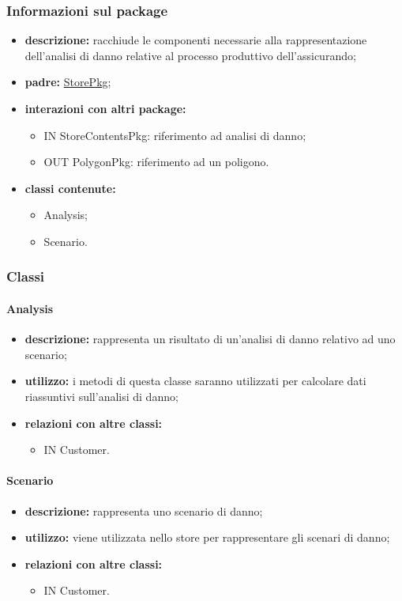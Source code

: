 \subsubsection{Informazioni sul package}
\begin{itemize}
	\item \textbf{descrizione:} racchiude le componenti necessarie alla rappresentazione dell'analisi di danno relative al processo produttivo dell'assicurando;
	\item \textbf{padre:} \hyperref[pkg::StorePkg]{StorePkg};
	\item \textbf{interazioni con altri package:} 
	\begin{itemize}
		\item IN StoreContentsPkg: riferimento ad analisi di danno;
		\item OUT PolygonPkg: riferimento ad un poligono.
	\end{itemize}
	\item \textbf{classi contenute:}
	\begin{itemize}
		\item Analysis;
		\item Scenario.
	\end{itemize}
\end{itemize}
\subsubsection{Classi}
\paragraph{Analysis}
\begin{itemize}
	\item \textbf{descrizione:} rappresenta un risultato di un'analisi di danno relativo ad uno scenario;
	\item \textbf{utilizzo:} i metodi di questa classe saranno utilizzati per calcolare dati riassuntivi sull'analisi di danno;
	\item \textbf{relazioni con altre classi:} 
	\begin{itemize}
		\item IN Customer.
	\end{itemize}
\end{itemize}
\paragraph{Scenario}
\begin{itemize}
	\item \textbf{descrizione:} rappresenta uno scenario di danno;
	\item \textbf{utilizzo:} viene utilizzata nello store per rappresentare gli scenari di danno;
	\item \textbf{relazioni con altre classi:} 
	\begin{itemize}
		\item IN Customer.
	\end{itemize}
\end{itemize}
\newpage
